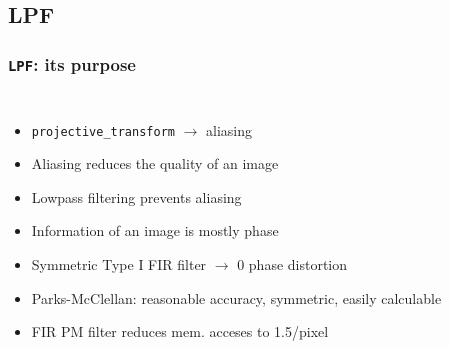 \documentclass{beamer}
\begin{document}
\subsection{LPF}
\begin{frame}
	\frametitle{{\tt LPF}: its purpose}
	\begin{columns}[c]
		\begin{itemize}
		\item<1-> {\tt projective\_transform} \(\rightarrow\) aliasing
		\item<3-> Aliasing reduces the quality of an image
		\item<4-> Lowpass filtering prevents aliasing
		\item<5-> Information of an image is mostly phase
		\item<8-> Symmetric Type I FIR filter \(\rightarrow\) 0 phase distortion
		\item<9-> Parks-McClellan: reasonable accuracy, symmetric, easily calculable
		\item<10-> FIR PM filter reduces mem. acceses to 1.5/pixel
		\end{itemize}
	
	\end{columns}
\end{frame}
\end{document}
